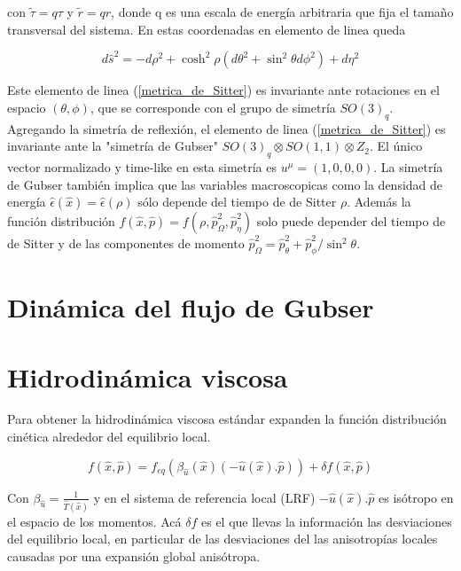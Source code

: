\documentclass[11pt,a4paper]{article}
\begin{document}
con $\tilde{\tau}=q\tau$ y $\tilde{r}=qr$, donde q es una escala de energía arbitraria que fija el tamaño transversal del sistema. En estas coordenadas en elemento de linea queda



\begin{equation}
d\hat{s}^2=-d{\rho}^2+\cosh^2{\rho}(d{\theta}^2+\sin^2{\theta}d{\phi}^2)+d{\eta}^2
\label{metrica_de_Sitter}
\end{equation}

Este elemento de linea (\ref{metrica_de_Sitter}) es invariante ante rotaciones en el espacio $(\theta,\phi)$, que se corresponde con el grupo de simetría $SO(3)_q$. Agregando la simetría de reflexión, el elemento de linea (\ref{metrica_de_Sitter}) es invariante ante la "simetría de Gubser" $SO(3)_{q}{\otimes}SO(1,1){\otimes}Z_{2}$. El único vector normalizado y time-like en esta simetría es $u^{\mu}=(1,0,0,0)$.
La simetría de Gubser también implica que las variables macroscopicas como la densidad de energía $\hat{\epsilon}(\hat{x})=\hat{\epsilon}(\rho)$ sólo depende del tiempo de de Sitter $\rho$. Además la función distribución $f( \hat{x}, \hat{p})=f( \rho, \hat{p}^2_{\Omega},\hat{p}^2_{\eta})$ solo puede depender del tiempo de de Sitter y de las componentes de momento $\hat{p}^2_{\Omega}=\hat{p}^2_{\theta}+\hat{p}^2_{\phi}/\sin^2\theta$.

\section{Dinámica del flujo de Gubser}




\section{Hidrodinámica viscosa}

Para obtener la hidrodinámica viscosa estándar expanden la función distribución cinética alrededor del equilibrio local.

\begin{equation}
f( \hat{x}, \hat{p})= f_{eq}(\beta_{\hat{u}}(\hat{x})(-\hat{u}(\hat{x}).\hat{p}))+{\delta}f( \hat{x}, \hat{p})
\label{expansion}
\end{equation}

Con $\beta_{\hat{u}}=\frac{1}{\hat{T}(\hat{x})}$ y en el sistema de referencia local (LRF) $-\hat{u}(\hat{x}).\hat{p}$ es isótropo en el espacio de los momentos. Acá ${\delta}f$ es el que llevas la información las desviaciones del equilibrio local, en particular de las desviaciones del las anisotropías locales causadas por una expansión global anisótropa.
\end{document}
